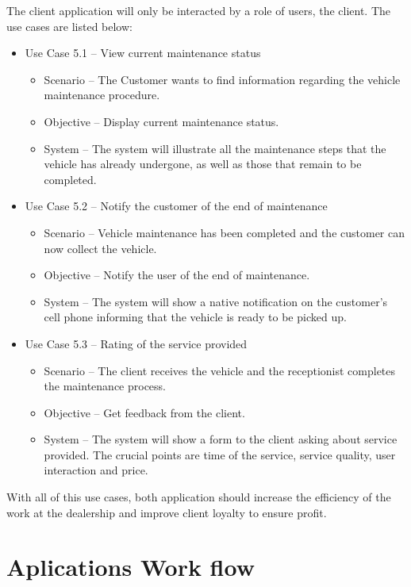 The client application will only be interacted by a role of users, the client.
The use cases are listed below:

\begin{itemize}
  \item Use Case 5.1 – View current maintenance status
  \begin{itemize}
    \item Scenario – The Customer wants to find information regarding the vehicle maintenance procedure.
    \item Objective – Display current maintenance status.
    \item System – The system will illustrate all the maintenance steps that the vehicle has already undergone, as well as those that remain to be completed. 
  \end{itemize}
  \item Use Case 5.2 – Notify the customer of the end of maintenance 
  \begin{itemize}
    \item Scenario – Vehicle maintenance has been completed and the customer can now collect the vehicle.
    \item Objective – Notify the user of the end of maintenance.
    \item System – The system will show a native notification on the customer's cell phone informing that the vehicle is ready to be picked up. 
  \end{itemize}
  \item Use Case 5.3 – Rating of the service provided
  \begin{itemize}
    \item Scenario – The client receives the vehicle and the receptionist completes the maintenance process.
    \item Objective – Get feedback from the client.
    \item System – The system will show a form to the client asking about service provided. The crucial points are time of the service, service quality, user interaction and price.
  \end{itemize}
\end{itemize}
\hfill \break

With all of this use cases, both application should increase the efficiency of the work at the dealership and improve client loyalty to ensure profit.

\section{Aplications Work flow}


